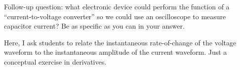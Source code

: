 \vskip 10pt

Follow-up question: what electronic device could perform the function of a ``current-to-voltage converter'' so we could use an oscilloscope to measure capacitor current?  Be as specific as you can in your answer.







Here, I ask students to relate the instantaneous rate-of-change of the voltage waveform to the instantaneous amplitude of the current waveform.  Just a conceptual exercise in derivatives.





